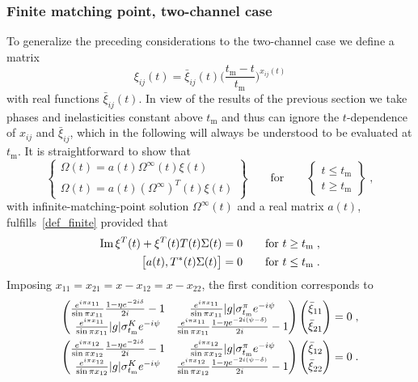 \documentclass[11pt]{article}%
\providecommand{\ec}{\;,}
\providecommand{\ep}{\;.}
\providecommand{\nt}{\notag}
\newcommand{\tm}{t_\text{m}}
\newcommand{\beq}{\begin{equation}}
\newcommand{\eeq}{\end{equation}}
\renewcommand{\Im}{\text{Im}\,}
\begin{document}
\subsubsection{Finite matching point, two-channel case}

To generalize the preceding considerations to the two-channel case we define a matrix
\beq
\xi_{ij}(t)=\bar \xi_{ij}(t)  \bigg(\frac{\tm-t}{\tm}\bigg)^{x_{ij}(t)}
\eeq
with real functions $\bar\xi_{ij}(t)$. In view of the results of the previous section we take phases and inelasticities constant above $\tm$ and thus can ignore the $t$-dependence of $x_{ij}$ and $\bar\xi_{ij}$, which in the following will always be understood to be evaluated at $\tm$. It is straightforward to show that 
\beq
\label{sol_fin_Omega_til}
\begin{Bmatrix}\Omega(t)=a(t)\Omega^\infty(t) \xi(t) \\ 
\Omega(t)=a(t)(\Omega^\infty)^T(t)\xi(t)\end{Bmatrix}
\qquad \text{for} \qquad
\begin{Bmatrix}t \leq \tm \\ t\geq\tm\end{Bmatrix}\ec
\eeq
with infinite-matching-point solution $\Omega^\infty(t)$ and a real matrix $a(t)$, fulfills~\eqref{def_finite} provided that
\begin{align}
\label{cond_xi}
\Im\xi^T(t)+\xi^T(t) T(t)\Sigma(t)&=0\qquad \text{for}\ t\geq\tm\ec\nt\\
\big[a(t),T^*(t)\Sigma(t)\big]&=0\qquad \text{for}\ t\leq\tm\ep
\end{align} 
Imposing $x_{11}=x_{21}=x-x_{12}=x-x_{22}$, the first condition corresponds to
\begin{align}
\label{eq_xi}
\renewcommand{\arraystretch}{1.3}
 \begin{pmatrix}
 \frac{e^{i\pi x_{11}}}{\sin\pi x_{11}}\frac{1-\eta e^{-2i\delta}}{2i}-1 & \frac{e^{i\pi x_{11}}}{\sin\pi x_{11}}|g|\sigma_{\tm}^\pi e^{-i\psi}\\
\frac{e^{i\pi x_{11}}}{\sin\pi x_{11}}|g|\sigma_{\tm}^K e^{-i\psi} & \frac{e^{i\pi x_{11}}}{\sin\pi x_{11}}\frac{1-\eta e^{-2i(\psi-\delta)}}{2i}-1
\end{pmatrix}
\begin{pmatrix}
 \bar\xi_{11}\\ 
\bar\xi_{21}
\end{pmatrix}
&=0\ec\nt\\
%
\renewcommand{\arraystretch}{1.3}
 \begin{pmatrix}
 \frac{e^{i\pi x_{12}}}{\sin\pi x_{12}}\frac{1-\eta e^{-2i\delta}}{2i}-1 & \frac{e^{i\pi x_{12}}}{\sin\pi x_{12}}|g|\sigma_{\tm}^\pi e^{-i\psi}\\
\frac{e^{i\pi x_{12}}}{\sin\pi x_{12}}|g|\sigma_{\tm}^K e^{-i\psi} & \frac{e^{i\pi x_{12}}}{\sin\pi x_{12}}\frac{1-\eta e^{-2i(\psi-\delta)}}{2i}-1
\end{pmatrix}
\begin{pmatrix}
 \bar\xi_{12}\\ 
\bar\xi_{22}
\end{pmatrix}
&=0\ep
\end{align}
\end{document}
